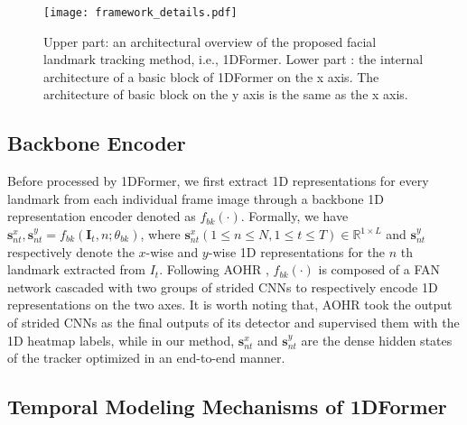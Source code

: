 \documentclass[review]{elsarticle}
\begin{document}
\begin{figure}
	\centering
	\texttt{[image: framework\_details.pdf]}
	\caption{Upper part: an architectural overview of the proposed facial landmark tracking method, i.e., 1DFormer. Lower part
		: the internal architecture of a basic block of 1DFormer on the x axis. The architecture of basic block on the y axis is the same as the x axis.
	}
	\label{framework}
\end{figure}


\subsection{Backbone Encoder}
Before processed by 1DFormer, we first extract 1D representations for every landmark from each individual frame image through a backbone 1D representation encoder denoted as $f_{bk}(\cdot)$. Formally, we have $\textbf{s}^x_{nt},\textbf{s}^y_{nt} = f_{bk}(\textbf{I}_{t}, n;\theta_{bk})$, where $\textbf{s}^x_{nt} (1\leq n \leq N, 1\leq t \leq T)\in\mathbb{R}^{1 \times L}$ and $\textbf{s}^y_{nt}$ respectively denote the $x$-wise and $y$-wise 1D representations for the $n$ th landmark extracted from $I_t$.
Following AOHR \cite{AOHR}, $f_{bk}(\cdot)$ is composed of a FAN network \cite{how_far} cascaded with two groups of strided CNNs to respectively encode 1D representations on the two axes. It is worth noting that, AOHR took the output of strided CNNs as the final outputs of its detector and supervised them with the 1D heatmap labels, while in our method, $\textbf{s}^x_{nt}$ and $\textbf{s}^y_{nt}$ are the dense hidden states of the tracker optimized in an end-to-end manner. 

\subsection{Temporal Modeling Mechanisms of 1DFormer}
\label{temporal}
\end{document}
